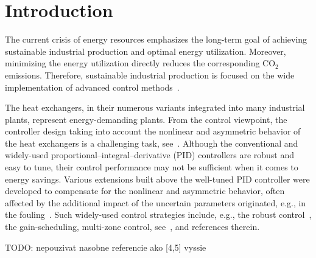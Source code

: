 \documentclass[preprint,12pt]{elsarticle}
\begin{document}
	
	\section{Introduction}
	\label{sec:introduction}
	
	
	
	The current crisis of energy resources emphasizes the long-term goal of achieving sustainable industrial production and optimal energy utilization. Moreover, minimizing the energy utilization directly reduces the corresponding CO$_{2}$ emissions. Therefore, sustainable industrial production is focused on the wide implementation of advanced control methods~\cite{MN20}. 
	
	The heat exchangers, in their numerous variants integrated into many industrial plants, represent energy-demanding plants. From the control viewpoint, the controller design taking into account the nonlinear and asymmetric behavior of the heat exchangers is a challenging task, see~\cite{RL20}. Although the conventional and widely-used proportional–integral–derivative (PID) controllers are robust and easy to tune, their control performance may not be sufficient when it comes to energy savings. Various extensions built above the well-tuned PID controller were developed to compensate for the nonlinear and asymmetric behavior, often affected by the additional impact of the uncertain parameters originated, e.g., in the fouling~\cite{MT19}. Such widely-used control strategies include, e.g., the robust control~\cite{DO15,WY18}, the gain-scheduling, multi-zone control, see~\cite{MF08}, and references therein.
	
	TODO: nepouzivat nasobne referencie ako [4,5] vyssie
	
\end{document}
